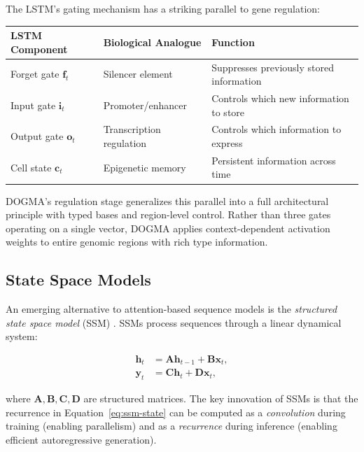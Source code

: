 \begin{bioinsight}
The LSTM's gating mechanism has a striking parallel to gene regulation:
\begin{center}
\renewcommand{\arraystretch}{1.12}
\begin{tabularx}{0.9\textwidth}{L{3cm} L{3.5cm} Y}
\toprule
\textbf{LSTM Component} & \textbf{Biological Analogue} & \textbf{Function} \\
\midrule
Forget gate $\mathbf{f}_t$ & Silencer element & Suppresses previously stored information \\
Input gate $\mathbf{i}_t$ & Promoter/enhancer & Controls which new information to store \\
Output gate $\mathbf{o}_t$ & Transcription regulation & Controls which information to express \\
Cell state $\mathbf{c}_t$ & Epigenetic memory & Persistent information across time \\
\bottomrule
\end{tabularx}
\end{center}
DOGMA's regulation stage generalizes this parallel into a full architectural principle with typed bases and region-level control. Rather than three gates operating on a single vector, DOGMA applies context-dependent activation weights to entire genomic regions with rich type information.
\end{bioinsight}

\subsection{State Space Models}

An emerging alternative to attention-based sequence models is the \emph{structured state space model} (SSM) \citep{gu2022s4, gu2023mamba}. SSMs process sequences through a linear dynamical system:

\begin{align}
\mathbf{h}_t &= \mathbf{A} \mathbf{h}_{t-1} + \mathbf{B} \mathbf{x}_t, \label{eq:ssm-state} \\
\mathbf{y}_t &= \mathbf{C} \mathbf{h}_t + \mathbf{D} \mathbf{x}_t, \label{eq:ssm-output}
\end{align}

where $\mathbf{A}, \mathbf{B}, \mathbf{C}, \mathbf{D}$ are structured matrices. The key innovation of SSMs is that the recurrence in Equation~\ref{eq:ssm-state} can be computed as a \emph{convolution} during training (enabling parallelism) and as a \emph{recurrence} during inference (enabling efficient autoregressive generation).

